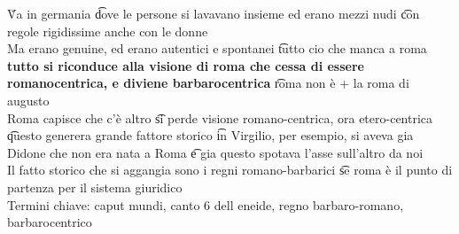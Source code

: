 \documentclass[12pt]{article}
\begin{document}
\v

Va in germania \t dove le persone si lavavano insieme ed erano mezzi nudi \t con regole rigidissime anche con le donne \\
Ma erano genuine, ed erano autentici e spontanei \t tutto cio che manca a roma \t \textbf{tutto si riconduce alla visione di roma che cessa di essere romanocentrica, e diviene barbarocentrica} \t roma non è + la roma di augusto \\
Roma capisce che c'è altro \t si perde visione romano-centrica, ora etero-centrica \t questo generera grande fattore storico \t in Virgilio, per esempio, si aveva gia Didone che non era nata a Roma \t e gia questo spotava l'asse sull'altro da noi \\
Il fatto storico che si aggangia sono i regni romano-barbarici \t se roma è il punto di partenza per il sistema giuridico \\
Termini chiave: caput mundi, canto 6 dell eneide, regno barbaro-romano, barbarocentrico
\end{document}
